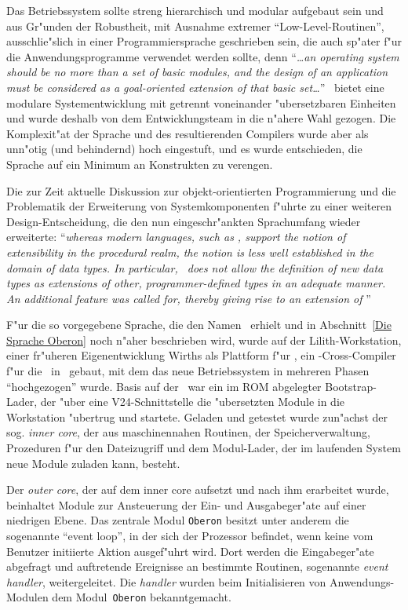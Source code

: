 Das Betriebssystem sollte streng hierarchisch und modular aufgebaut sein
und aus Gr"unden der Robustheit, mit Ausnahme extremer "`Low-Level-Routinen"',
ausschlie"slich in einer Programmiersprache geschrieben sein, die auch sp"ater
f"ur die Anwendungsprogramme verwendet werden sollte, denn
"`{\it\ldots an operating system should be no more than a set of basic modules, and
the design of an application must be considered as a goal-oriented extension
of that basic set\ldots}"'\cite{modulaToOberon2}
\modula\ bietet eine modulare Systementwicklung mit getrennt voneinander
"ubersetzbaren Einheiten und wurde deshalb von dem Entwicklungsteam
in die n"ahere Wahl gezogen.
Die Komplexit"at der Sprache und des resultierenden Compilers wurde aber
als unn"otig (und behindernd) hoch eingestuft, und es wurde entschieden,
die Sprache auf ein Minimum an Konstrukten zu verengen.

Die zur Zeit aktuelle Diskussion zur objekt-orientierten Programmierung
und die Problematik der Erweiterung von Systemkomponenten f"uhrte zu
einer weiteren Design-Entscheidung, die den nun eingeschr"ankten Sprachumfang
wieder erweiterte:
"`{\it whereas modern languages, such as \/\modula, support the notion of
extensibility in the procedural realm, the notion is less well established
in the domain of data types.
In particular, \modula\ does not allow the definition of new data types as
extensions of other, programmer-defined types in an adequate manner.
An additional feature was called for, thereby giving rise to an\/ {\em extension}
of \modula}"'%
\cite{modulaToOberon2}

F"ur die so vorgegebene Sprache, die den Namen \oberon\ erhielt und in
Abschnitt~\ref{Die Sprache Oberon} noch n"aher beschrieben wird,
wurde auf der Lilith-Workstation, einer
fr"uheren Eigenentwicklung Wirths als Plattform f"ur \modula, ein
\oberon-Cross-Compiler f"ur die \ceres\ in \modula\ gebaut, mit dem
das neue Betriebssystem in mehreren Phasen "`hochgezogen"' wurde.
Basis auf der \ceres\ war ein im ROM abgelegter Bootstrap-Lader,
der "uber eine V24-Schnittstelle die "ubersetzten Module in die
Workstation "ubertrug und startete.
Geladen und getestet wurde zun"achst der sog. {\it inner core}, der
aus maschinennahen Routinen, der Speicherverwaltung, Prozeduren f"ur
den Dateizugriff und dem Modul-Lader, der im laufenden System neue
Module zuladen kann, besteht.\cite{design}

Der {\it outer core}, der auf dem inner core aufsetzt und nach ihm erarbeitet
wurde, beinhaltet Module zur Ansteuerung der Ein- und Ausgabeger"ate auf
einer niedrigen Ebene.
Das zentrale Modul {\tt Oberon\/} besitzt unter anderem die sogenannte "`event loop"', in
der sich der Prozessor befindet, wenn keine vom Benutzer initiierte Aktion
ausgef"uhrt wird.
Dort werden die Eingabeger"ate abgefragt und auftretende Ereignisse an
bestimmte Routinen, sogenannte {\it event handler}, weitergeleitet.
Die {\it handler\/} wurden beim Initialisieren von Anwendungs-Modulen dem
Modul~{\tt Oberon\/} bekanntgemacht.


